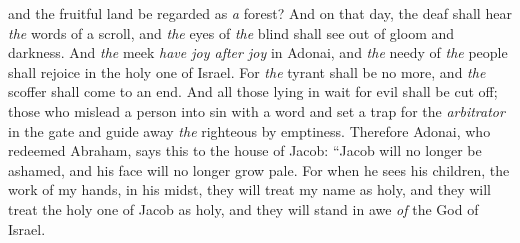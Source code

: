 \begin{biblechapter}
and the fruitful land be regarded as \textit{a} forest?
\verse And on that day, the deaf shall hear \textit{the} words of a scroll, 
and \textit{the} eyes of \textit{the} blind shall see out of gloom and darkness.
\verse And \textit{the} meek \textit{have joy after joy} in Adonai, 
and \textit{the} needy of \textit{the} people shall rejoice in the holy one of Israel.
\verse For \textit{the} tyrant shall be no more, 
and \textit{the} scoffer shall come to an end. 
And all those lying in wait for evil shall be cut off;
\verse those who mislead a person into sin with a word 
and set a trap for the \textit{arbitrator} in the gate 
and guide away \textit{the} righteous by emptiness.
\verse Therefore Adonai, who redeemed Abraham, says this to the house of Jacob:
\verse “Jacob will no longer be ashamed, 
and his face will no longer grow pale.
\verse For when he sees his children, 
the work of my hands, in his midst, 
they will treat my name as holy, 
and they will treat the holy one of Jacob as holy, 
and they will stand in awe \textit{of} the God of Israel.
\end{biblechapter}

